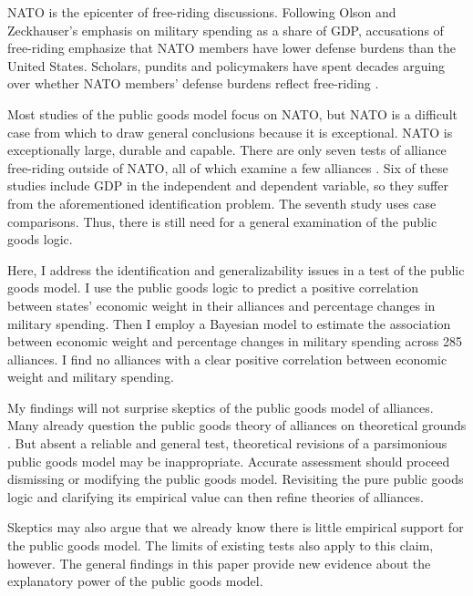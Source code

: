 \documentclass[12pt]{article}
\begin{document}
NATO is the epicenter of free-riding discussions. 
Following Olson and Zeckhauser's emphasis on military spending as a share of GDP, accusations of free-riding emphasize that NATO members have lower defense burdens than the United States. 
Scholars, pundits and policymakers have spent decades arguing over whether NATO members' defense burdens reflect free-riding \citep{SandlerForbes1980, Palmer1990, Boyer1993, GatesTerasawa1992, SandlerHartley2001, Lanoszka2015, PluemperNeumayer2015}.


Most studies of the public goods model focus on NATO, but NATO is a difficult case from which to draw general conclusions because it is exceptional. 
NATO is exceptionally large, durable and capable. 
There are only seven tests of alliance free-riding outside of NATO, all of which examine a few alliances \citep{Russett1970, Starr1974, Reisinger1983, Thies1987, ConybeareSandler1990, OnealWhatley1996, Siroky2012}. 
Six of these studies include GDP in the independent and dependent variable, so they suffer from the aforementioned identification problem.
The seventh study uses case comparisons.
Thus, there is still need for a general examination of the public goods logic. 


Here, I address the identification and generalizability issues in a test of the public goods model.  
I use the public goods logic to predict a positive correlation between states' economic weight in their alliances and percentage changes in military spending. 
Then I employ a Bayesian model to estimate the association between economic weight and percentage changes in military spending across 285 alliances. 
I find no alliances with a clear positive correlation between economic weight and military spending. 


My findings will not surprise skeptics of the public goods model of alliances. 
Many already question the public goods theory of alliances on theoretical grounds \citep{Palmer1990, GatesTerasawa1992, SandlerHartley2001, Norrlof2010, NiouZeigler2019}.
But absent a reliable and general test, theoretical revisions of a parsimonious public goods model may be inappropriate.
Accurate assessment should proceed dismissing or modifying the public goods model. 
Revisiting the pure public goods logic and clarifying its empirical value can then refine theories of alliances. 


Skeptics may also argue that we already know there is little empirical support for the public goods model. 
The limits of existing tests also apply to this claim, however. 
The general findings in this paper provide new evidence about the explanatory power of the public goods model. 
\end{document}
